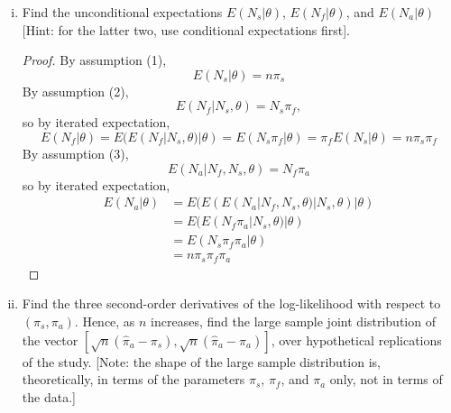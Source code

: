 \documentclass[letterpaper, 12pt]{article}
\begin{document}
\begin{enumerate}[(i)]
\begin{proof}
Define
\[
\ell(\theta, \underline{N})
=
\log L(\theta, \underline{N})
=
C + N_s \log (\pi_s) + (n - N_s)\log(1 - \pi_s) + N_a \log(\pi_a) + (N_f - N_a)\log(1- \pi_a)  
\]
where $C = N_f \log (\pi_f) + (N_s - N_f)\log(1-\pi_f)$, which does not depend on $\pi_s$ or $\pi_a$.
Thus,
\begin{align*}
\frac{\partial \ell(\theta, \underline{N})}{\partial \pi_s}
&=
\frac{N_s}{\pi_s} - \frac{n - N_s}{1-\pi_s}
\\
\frac{\partial \ell(\theta, \underline{N})}{\partial \pi_a}
&=
\frac{N_a}{\pi_a} - \frac{N_f - N_a}{1-\pi_a}
\end{align*} 
which implies that the MLEs are the values that set the scores equal to 0, i.e.
\begin{align*}
\hat{\pi_s} &= \frac{N_s}{n} \\
\hat{\pi_a} &= \frac{N_a}{N_f}
\end{align*}
It is easy to see that second derivatives of the scores are negative, so $\hat{\pi_s}$ and $\hat{\pi_a}$ maximize the likelihood function. Since the scores $S_s$ and $S_a$ do not depend on $\pi_f$, the MLEs would not change if we did not know $\pi_f$.
\end{proof}
\item
Find the unconditional expectations $E(N_s |\theta)$, $E(N_f | \theta)$, and $E(N_a | \theta)$ [Hint: for the latter two, use conditional expectations first].
\begin{proof}
By assumption (1),
\[
E(N_s |\theta) = n\pi_s
\]
By assumption (2),
\[
E(N_f | N_s, \theta) = N_s \pi_f,
\]
so by iterated expectation,
\[
E(N_f | \theta) 
= 
E(E(N_f | N_s, \theta) | \theta)
=
E(N_s \pi_f | \theta)
=
\pi_f
E(N_s | \theta)
=
n \pi_s \pi_f
\]
By assumption (3),
\[
E(N_a | N_f, N_s, \theta) = N_f \pi_a
\]
so by iterated expectation,
\begin{align*}
E(N_a | \theta) 
&= E(E(E(N_a | N_f, N_s, \theta) | N_s, \theta) | \theta)
\\
&=
E(E(N_f \pi_a | N_s, \theta) | \theta)
\\
&=
E( N_s \pi_f \pi_a | \theta)
\\
&=
n \pi_s \pi_f \pi_a
\end{align*}
\end{proof}
\item
Find the three second-order derivatives of the log-likelihood with respect to $(\pi_s,\pi_a)$. 
Hence, as $n$ increases, find the large sample joint distribution of the vector $[\sqrt{n}(\hat{\pi}_a - \pi_s), \sqrt{n}(\hat{\pi}_a - \pi_a)]$, over hypothetical replications of the study. [Note: the shape of the large sample distribution is, theoretically, in terms of the parameters $\pi_s$, $\pi_f$, and $\pi_a$ only, not in terms of the data.]

\end{enumerate}
\end{document}
